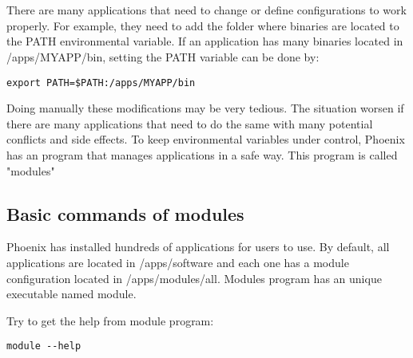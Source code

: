 
\chapter{\moduleTitle}
\newpage
There are many applications that need to change or define configurations to work properly. For example, they need to add the folder where binaries are located to the PATH environmental variable. If an application has many binaries located in /apps/MYAPP/bin, setting the PATH variable can be done by: 
\begin{lstlisting}
export PATH=$PATH:/apps/MYAPP/bin
\end{lstlisting}

Doing manually these modifications may be very tedious. The situation worsen if there are many applications that need to do the same with many potential conflicts and side effects. To keep environmental variables under control, Phoenix has an program that manages applications in a safe way. This program is called "modules"

\section{Basic commands of modules }
Phoenix has installed hundreds of applications for users to use. By default, all applications are located in /apps/software and each one has a module configuration located in /apps/modules/all.
Modules program has an unique executable named module. 
\begin{steps}
	Try to get the help from module program:
	\begin{lstlisting}[style=command_syntax]
	module --help
	\end{lstlisting}
\end{steps}

